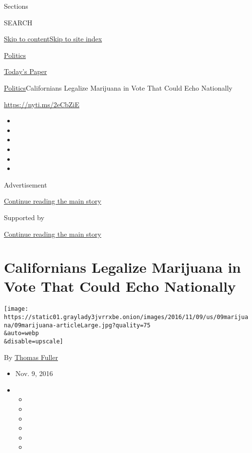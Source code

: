 Sections

SEARCH

\protect\hyperlink{site-content}{Skip to
content}\protect\hyperlink{site-index}{Skip to site index}

\href{https://www.nytimes3xbfgragh.onion/section/politics}{Politics}

\href{https://myaccount.nytimes3xbfgragh.onion/auth/login?response_type=cookie\&client_id=vi}{}

\href{https://www.nytimes3xbfgragh.onion/section/todayspaper}{Today's
Paper}

\href{/section/politics}{Politics}\textbar{}Californians Legalize
Marijuana in Vote That Could Echo Nationally

\url{https://nyti.ms/2eCbZiE}

\begin{itemize}
\item
\item
\item
\item
\item
\item
\end{itemize}

Advertisement

\protect\hyperlink{after-top}{Continue reading the main story}

Supported by

\protect\hyperlink{after-sponsor}{Continue reading the main story}

\hypertarget{californians-legalize-marijuana-in-vote-that-could-echo-nationally}{%
\section{Californians Legalize Marijuana in Vote That Could Echo
Nationally}\label{californians-legalize-marijuana-in-vote-that-could-echo-nationally}}

\texttt{[image: https://static01.graylady3jvrrxbe.onion/images/2016/11/09/us/09marijuana/09marijuana-articleLarge.jpg?quality=75\\\&auto=webp\\\&disable=upscale]}

By \href{https://www.nytimes3xbfgragh.onion/by/thomas-fuller}{Thomas
Fuller}

\begin{itemize}
\item
  Nov. 9, 2016
\item
  \begin{itemize}
  \item
  \item
  \item
  \item
  \item
  \item
  \end{itemize}
\end{itemize}


